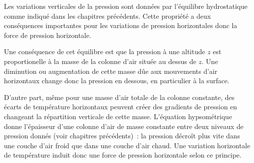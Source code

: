 
\sk
Les variations verticales de la pression sont données par l'équilibre hydrostatique comme indiqué dans les chapitres précédents. Cette propriété a deux conséquences importantes pour les variations de pression horizontales donc la force de pression horizontale. 
\begin{finger}
\item Une conséquence de cet équilibre est que la pression à une altitude $z$ est proportionelle à la masse de la colonne d'air située au dessus de $z$. Une diminution ou augmentation de cette masse dûe aux mouvements d'air horizontaux change donc la pression en dessous, en particulier à la surface.
\item D'autre part, même pour une masse d'air totale de la colonne constante, des écarts de température horizontaux peuvent créer des gradients de pression en changeant la répartition verticale de cette masse. L'équation hypsométrique donne l'épaisseur d'une colonne d'air de masse constante entre deux niveaux de pression donnés (voir chapitres précédents)~: la pression décroît plus vite dans une couche d'air froid que dans une couche d'air chaud. Une variation horizontale de température induit donc une force de pression horizontale selon ce principe.
\end{finger}



